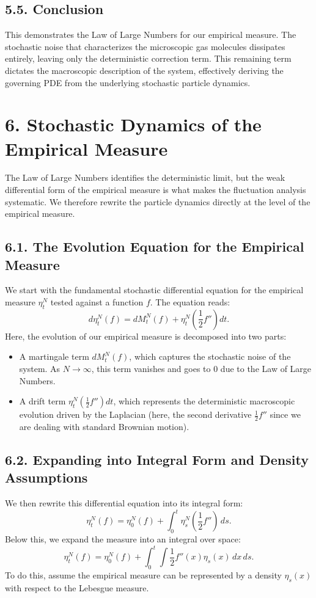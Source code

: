 \documentclass[11pt]{article}
\theoremstyle{definition}
\theoremstyle{remark}
\begin{document}
\subsection*{5.5. Conclusion}
This demonstrates the Law of Large Numbers for our empirical measure. The stochastic noise that characterizes the microscopic gas molecules dissipates entirely, leaving only the deterministic correction term. This remaining term dictates the macroscopic description of the system, effectively deriving the governing PDE from the underlying stochastic particle dynamics.

\section*{6. Stochastic Dynamics of the Empirical Measure}
The Law of Large Numbers identifies the deterministic limit, but the weak differential form of the empirical measure is what makes the fluctuation analysis systematic. We therefore rewrite the particle dynamics directly at the level of the empirical measure.

\subsection*{6.1. The Evolution Equation for the Empirical Measure}
We start with the fundamental stochastic differential equation for the empirical measure $\eta_t^N$ tested against a function $f$. The equation reads:
\[
d\eta_t^N(f)=dM_t^N(f)+\eta_t^N\!\left(\frac{1}{2}f''\right)dt.
\]
Here, the evolution of our empirical measure is decomposed into two parts:
\begin{itemize}
\item A martingale term $dM_t^N(f)$, which captures the stochastic noise of the system. As $N\to\infty$, this term vanishes and goes to $0$ due to the Law of Large Numbers.
\item A drift term $\eta_t^N\!\left(\frac{1}{2}f''\right)dt$, which represents the deterministic macroscopic evolution driven by the Laplacian (here, the second derivative $\frac{1}{2}f''$ since we are dealing with standard Brownian motion).
\end{itemize}

\subsection*{6.2. Expanding into Integral Form and Density Assumptions}
We then rewrite this differential equation into its integral form:
\[
\eta_t^N(f)=\eta_0^N(f)+\int_0^t \eta_s^N\!\left(\frac{1}{2}f''\right)\,ds.
\]
Below this, we expand the measure into an integral over space:
\[
\eta_t^N(f)=\eta_0^N(f)+\int_0^t \int \frac{1}{2}f''(x)\eta_s(x)\,dx\,ds.
\]
To do this, assume the empirical measure can be represented by a density $\eta_s(x)$ with respect to the Lebesgue measure.
\end{document}
